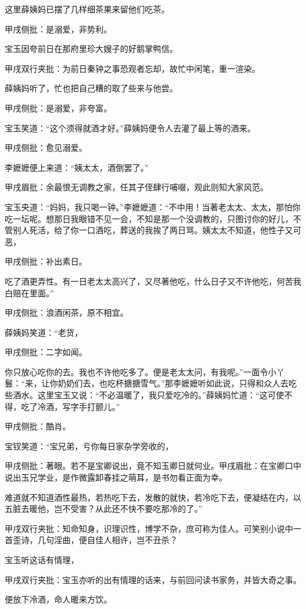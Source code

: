 \begin{parag}
    这里薛姨妈已摆了几样细茶果来留他们吃茶。\begin{note}甲戌侧批：是溺爱，非势利。\end{note}宝玉因夸前日在那府里珍大嫂子的好鹅掌鸭信。\begin{note}甲戌双行夹批：为前日秦钟之事恐观者忘却，故忙中闲笔，重一渲染。\end{note}薛姨妈听了，忙也把自己糟的取了些来与他尝。\begin{note}甲戌侧批：是溺爱，非夸富。\end{note}宝玉笑道：“这个须得就酒才好。”薛姨妈便令人去灌了最上等的酒来。\begin{note}甲戌侧批：愈见溺爱。\end{note}李嬷嬷便上来道：“姨太太，酒倒罢了。”\begin{note}甲戌眉批：余最恨无调教之家，任其子侄肆行哺啜，观此则知大家风范。\end{note}宝玉央道：“妈妈，我只喝一钟。”李嬷嬷道：“不中用！当著老太太、太太，那怕你吃一坛呢。想那日我眼错不见一会，不知是那一个没调教的，只图讨你的好儿，不管别人死活，给了你一口酒吃，葬送的我挨了两日骂。姨太太不知道，他性子又可恶，\begin{note}甲戌侧批：补出素日。\end{note}吃了酒更弄性。有一日老太太高兴了，又尽著他吃，什么日子又不许他吃，何苦我白赔在里面。”\begin{note}甲戌侧批：浪酒闲茶，原不相宜。\end{note}薛姨妈笑道：“老货，\begin{note}甲戌侧批：二字如闻。\end{note}你只放心吃你的去。我也不许他吃多了。便是老太太问，有我呢。”一面令小丫鬟：“来，让你奶奶们去，也吃杯搪搪雪气。”那李嬷嬷听如此说，只得和众人去吃些酒水。这里宝玉又说：“不必温暖了，我只爱吃冷的。”薛姨妈忙道：“这可使不得，吃了冷酒，写字手打颤儿。”\begin{note}甲戌侧批：酷肖。\end{note}宝钗笑道：“宝兄弟，亏你每日家杂学旁收的，\begin{note}甲戌侧批：著眼。若不是宝卿说出，竟不知玉卿日就何业。甲戌眉批：在宝卿口中说出玉兄学业，是作微露卸春挂之萌耳，是书勿看正面为幸。\end{note}难道就不知道酒性最热，若热吃下去，发散的就快，若冷吃下去，便凝结在内，以五脏去暖他，岂不受害？从此还不快不要吃那冷的了。”\begin{note}甲戌双行夹批：知命知身，识理识性，博学不杂，庶可称为佳人。可笑别小说中一首歪诗，几句淫曲，便自佳人相许，岂不丑杀？\end{note}宝玉听这话有情理，\begin{note}甲戌双行夹批：宝玉亦听的出有情理的话来，与前回问读书家务，并皆大奇之事。\end{note}便放下冷酒，命人暖来方饮。
\end{parag}


